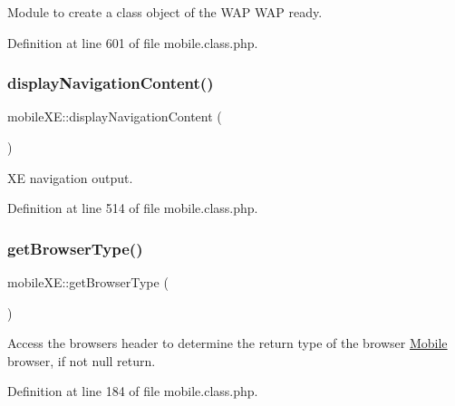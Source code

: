 Module to create a class object of the W\+AP W\+AP ready. 



Definition at line 601 of file mobile.\+class.\+php.

\mbox{\label{classmobileXE_a76d2b1e71a4146580ebfae85f02d9644}} 
\subsubsection{\texorpdfstring{display\+Navigation\+Content()}{displayNavigationContent()}}
{\footnotesize\ttfamily mobile\+X\+E\+::display\+Navigation\+Content (\begin{DoxyParamCaption}{ }\end{DoxyParamCaption})}



XE navigation output. 



Definition at line 514 of file mobile.\+class.\+php.

\mbox{\label{classmobileXE_a462a4900af63aa2bfbcea2168afbe876}} 
\subsubsection{\texorpdfstring{get\+Browser\+Type()}{getBrowserType()}}
{\footnotesize\ttfamily mobile\+X\+E\+::get\+Browser\+Type (\begin{DoxyParamCaption}{ }\end{DoxyParamCaption})}



Access the browser\textquotesingle{}s header to determine the return type of the browser \hyperlink{classMobile}{Mobile} browser, if not null return. 



Definition at line 184 of file mobile.\+class.\+php.

\mbox{\label{classmobileXE_a650f04e4701a5a1ae2ddceeb0f401166}} 
